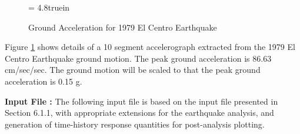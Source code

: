 \begin{figure}[ht]
\epsfxsize= 4.8truein
\centerline{}
\caption{Ground Acceleration for 1979 El Centro Earthquake}
\label{fig: elcentro-1979}
\end{figure}

\vspace{0.15 in}
Figure \ref{fig: elcentro-1979} shows details of a 10 segment
accelerograph extracted from the 1979 El Centro Earthquake ground motion.
The peak ground acceleration is 86.63 cm/sec/sec. The ground motion
will be scaled to that the peak ground acceleration is 0.15 g.

\vspace{0.15 in}\noindent
{\bf Input File :} The following input file is based on
the input file presented in Section 6.1.1,
with appropriate extensions for the earthquake analysis,
and generation of time-history response quantities for
post-analysis plotting.

